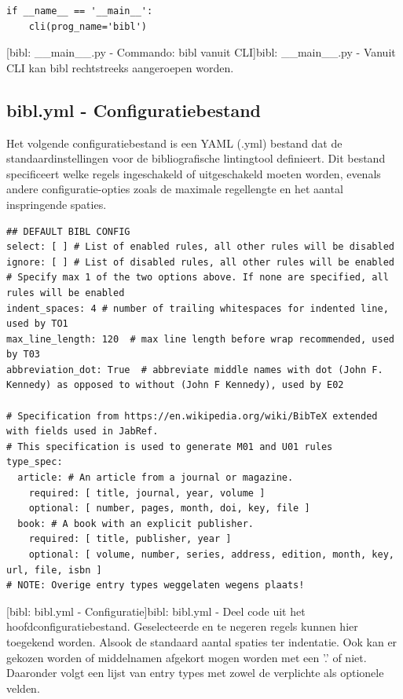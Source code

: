 \begin{verbatim}
if __name__ == '__main__':
    cli(prog_name='bibl')
\end{verbatim}
[bibl: \_\_main\_\_.py - Commando: bibl vanuit \acrshort{CLI}]{bibl: \_\_main\_\_.py - Vanuit \acrshort{CLI} kan bibl rechtstreeks aangeroepen worden. \label{lst:bibl_cli_command}}
\subsection{bibl.yml - Configuratiebestand}
Het volgende configuratiebestand is een YAML (.yml) bestand dat de standaardinstellingen voor de bibliografische lintingtool definieert. Dit bestand specificeert welke regels ingeschakeld of uitgeschakeld moeten worden, evenals andere configuratie-opties zoals de maximale regellengte en het aantal inspringende spaties.

\begin{verbatim}
## DEFAULT BIBL CONFIG
select: [ ] # List of enabled rules, all other rules will be disabled
ignore: [ ] # List of disabled rules, all other rules will be enabled
# Specify max 1 of the two options above. If none are specified, all rules will be enabled
indent_spaces: 4 # number of trailing whitespaces for indented line, used by TO1
max_line_length: 120  # max line length before wrap recommended, used by T03
abbreviation_dot: True  # abbreviate middle names with dot (John F. Kennedy) as opposed to without (John F Kennedy), used by E02

# Specification from https://en.wikipedia.org/wiki/BibTeX extended with fields used in JabRef.
# This specification is used to generate M01 and U01 rules
type_spec:
  article: # An article from a journal or magazine.
    required: [ title, journal, year, volume ]
    optional: [ number, pages, month, doi, key, file ]
  book: # A book with an explicit publisher.
    required: [ title, publisher, year ]
    optional: [ volume, number, series, address, edition, month, key, url, file, isbn ]
# NOTE: Overige entry types weggelaten wegens plaats!
\end{verbatim}
[bibl: bibl.yml - Configuratie]{bibl: bibl.yml - Deel code uit het hoofdconfiguratiebestand. Geselecteerde en te negeren regels kunnen hier toegekend worden. Alsook de standaard aantal spaties ter indentatie. Ook kan er gekozen worden of middelnamen afgekort mogen worden met een '.' of niet. Daaronder volgt een lijst van entry types met zowel de verplichte als optionele velden. \label{lst:bibl_config}}

